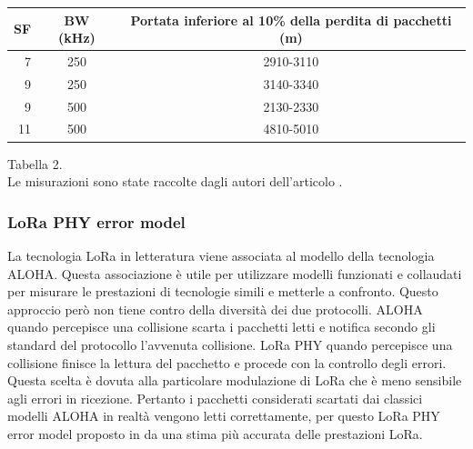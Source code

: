 \documentclass[a4paper]{report} %
\begin{document}
\begin{center}
\begin{tabular}{r|c|c|}
SF&BW (kHz)&Portata inferiore al 10\% della perdita di pacchetti (m)\\ \hline
7&250&2910-3110\\ \hline
9&250&3140-3340\\ \hline
9&500&2130-2330\\ \hline
11&500&4810-5010\\ \hline
\end{tabular}
Tabella 2. \\
Le misurazioni sono state raccolte dagli autori dell'articolo \cite{art:rif.44}. \\
\end{center}

\subsubsection{LoRa PHY error model}
La tecnologia LoRa in letteratura viene associata al modello della tecnologia ALOHA. Questa associazione è utile per utilizzare modelli funzionati e collaudati per misurare le prestazioni di tecnologie simili e metterle a confronto. Questo approccio però non tiene contro della diversità dei due protocolli. ALOHA quando percepisce una collisione scarta i pacchetti letti e notifica secondo gli standard del protocollo l'avvenuta collisione. LoRa PHY quando percepisce una collisione finisce la lettura del pacchetto e procede con la controllo degli errori. Questa scelta è dovuta alla particolare modulazione di LoRa che è meno sensibile agli errori in ricezione. Pertanto i pacchetti considerati scartati dai classici modelli ALOHA in realtà vengono letti correttamente, per questo LoRa PHY error model proposto in \cite{art:rif.49} da una stima più accurata delle prestazioni LoRa.
\end{document}

